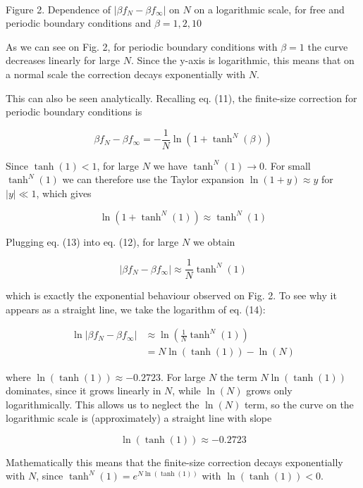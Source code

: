 ﻿\documentclass[11pt]{article}
\begin{document}
    \begin{center}
    \end{center}
    { \hspace*{\fill} \\}
    
    Figure 2. Dependence of \(|\beta f_N - \beta f_{\infty}|\) on \(N\) on a
logarithmic scale, for free and periodic boundary conditions and
\(\beta=1,2,10\)

    As we can see on Fig. 2, for periodic boundary conditions with
\(\beta = 1\) the curve decreases linearly for large \(N\). Since the
y-axis is logarithmic, this means that on a normal scale the correction
decays exponentially with \(N\).

This can also be seen analytically. Recalling eq. (11), the finite-size
correction for periodic boundary conditions is

\[
\beta f_N - \beta f_{\infty} = -\frac{1}{N}\ln\left(1+\tanh^N(\beta)\right) \tag{12}
\]

Since \(\tanh(1) < 1\), for large \(N\) we have \(\tanh^N(1) \to 0\).
For small \(\tanh^N(1)\) we can therefore use the Taylor expansion
\(\ln(1+y) \approx y\) for \(|y| \ll 1\), which gives

\[
\ln\left(1+\tanh^N(1)\right) \approx \tanh^N(1) \tag{13}
\]

Plugging eq. (13) into eq. (12), for large \(N\) we obtain

\[
\boxed{|\beta f_N - \beta f_{\infty}| \approx \frac{1}{N}\tanh^N(1)} \tag{14}
\]

which is exactly the exponential behaviour observed on Fig. 2. To see
why it appears as a straight line, we take the logarithm of eq. (14):

\[
\begin{aligned}
\ln|\beta f_N - \beta f_{\infty}| &\approx \ln\left(\frac{1}{N}\tanh^N(1)\right)\\
&= N\ln(\tanh(1)) - \ln(N)
\end{aligned} \tag{15}
\]

where \(\ln(\tanh(1)) \approx -0.2723\). For large \(N\) the term
\(N\ln(\tanh(1))\) dominates, since it grows linearly in \(N\), while
\(\ln(N)\) grows only logarithmically. This allows us to neglect the
\(\ln(N)\) term, so the curve on the logarithmic scale is
(approximately) a straight line with slope

\[
\boxed{\ln(\tanh(1)) \approx -0.2723} \tag{16}
\]

Mathematically this means that the finite-size correction decays
exponentially with \(N\), since \(\tanh^N(1) = e^{N\ln(\tanh(1))}\) with
\(\ln(\tanh(1)) < 0\).




    
    
    
\end{document}
